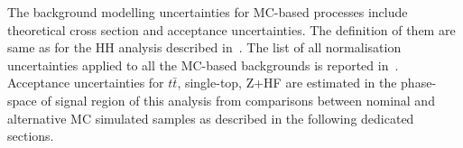 

The background modelling uncertainties for MC-based processes include theoretical cross section and acceptance uncertainties. The definition of them are same as for the HH analysis described in~. The list of all normalisation uncertainties applied to all the MC-based backgrounds is reported in~. Acceptance uncertainties for $t\bar{t}$, single-top, Z+HF are estimated in the phase-space of signal region of this analysis from comparisons between nominal and alternative MC simulated samples as described in the following dedicated sections.

